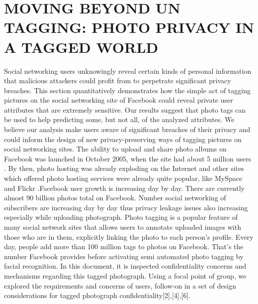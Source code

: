\section[Moving Beyond Un Tagging: Photo Privacy in a Tagged World]{\fontsize{14}{12}\selectfont MOVING BEYOND UN TAGGING: PHOTO PRIVACY IN A TAGGED WORLD }
Social networking users unknowingly reveal certain kinds of personal information that malicious attackers could profit from to perpetrate significant privacy breaches. This section quantitatively demonstrates how the simple act of tagging pictures on the social networking site of Facebook could reveal private user attributes that are extremely sensitive. Our results suggest that photo tags can be used to help predicting some, but not all, of the analyzed attributes. We believe our analysis make users aware of significant breaches of their privacy and could inform the design of new privacy-preserving ways of tagging pictures on social networking sites.
The ability to upload and share photo albums on Facebook was launched in October 2005, when the site had about 5 million users . By then, photo hosting was already exploding on the Internet and other sites which offered photo hosting services were already quite popular, like MySpace and Flickr .Facebook user growth is increasing day by day. There are currently almost 90 billion photos total on Facebook.%
Number social networking  of subscribers are increasing day by day thus privacy leakage issues also increasing especially while uploading photograph. Photo tagging is a popular feature of many social network sites that allows users to annotate uploaded images with those who are in them, explicitly linking the photo to each person’s  profile.
Every day, people add more than 100 million tags to photos on Facebook. That's the number Facebook provides before activating semi automated photo tagging by facial recognition.  In this document, it is inspected confidentiality concerns and mechanisms regarding this tagged photograph. Using a focal point of group, we explored the requirements and concerns of users, follow-on in a set of design considerations for tagged photograph confidentiality[2],[4],[6].

